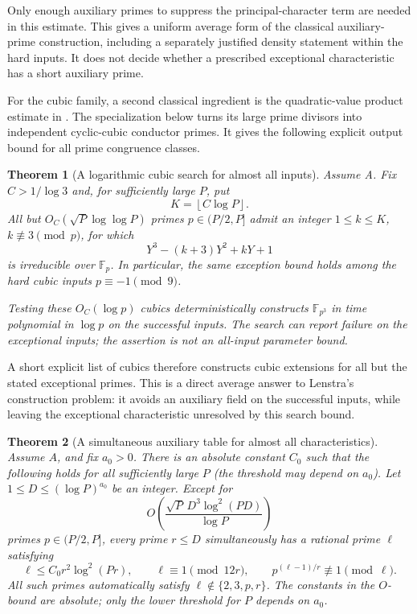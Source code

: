\documentclass[11pt]{article}
\newtheorem{theorem}{Theorem}[section]
\theoremstyle{definition}
\theoremstyle{remark}
\begin{document}
Only enough auxiliary primes to suppress the principal-character term
are needed in this estimate. This gives a uniform average form of the
classical auxiliary-prime construction, including a separately justified
density statement within the hard inputs. It does not decide whether a
prescribed exceptional characteristic has a short auxiliary prime.

For the cubic family, a second classical ingredient is the quadratic-value product estimate in \citet[Lemmas~1, 3, and 4 and \S2.4, pp.~1131--1134]{Cilleruelo2011}. The specialization below turns its large prime divisors into independent cyclic-cubic conductor primes. It gives the following explicit output bound for all prime congruence classes.

\begin{theorem}[A logarithmic cubic search for almost all inputs]
\label{thm:almost-all-small-tate}
Assume A.  Fix $C>1/\log3$ and, for sufficiently large $P$, put
\[
 K=\left\lfloor C\log P\right\rfloor.
\]
All but $O_C(\sqrt P\log\log P)$ primes $p\in(P/2,P]$
admit an integer $1\le k\le K$, $k\not\equiv3\pmod p$,
for which
\[
 Y^3-(k+3)Y^2+kY+1
\]
is irreducible over $\mathbb F_p$.  In particular, the same
exception bound holds among the hard cubic inputs
$p\equiv-1\pmod9$.

Testing these $O_C(\log p)$ cubics deterministically constructs
$\mathbb F_{p^3}$ in time polynomial in $\log p$ on the
successful inputs.  The search can report failure on the
exceptional inputs; the assertion is not an all-input parameter
bound.
\end{theorem}

A short explicit list of cubics therefore constructs cubic extensions
for all but the stated exceptional primes. This is a direct average
answer to Lenstra's construction problem: it avoids an auxiliary field
on the successful inputs, while leaving the exceptional characteristic
unresolved by this search bound.


\begin{theorem}[A simultaneous auxiliary table for almost all characteristics]\label{thm:aa-12r}
Assume \(A\), and fix \(a_0>0\). There is an absolute constant \(C_0\)
such that the following holds for all sufficiently large \(P\)
(the threshold may depend on \(a_0\)).
Let \(1\leq D\leq(\log P)^{a_0}\) be an integer.
Except for
\begin{equation}\label{eq:aa-12r-exceptions}
 O\!\left(
       \frac{\sqrt P\,D^3\log^2(PD)}{\log P}
    \right)
\end{equation}
primes \(p\in(P/2,P]\), every prime \(r\leq D\) simultaneously has
a rational prime \(\ell\) satisfying
\begin{equation}\label{eq:aa-12r-aux}
 \ell\leq C_0r^2\log^2(Pr),\qquad
 \ell\equiv1\pmod{12r},\qquad
 p^{(\ell-1)/r}\not\equiv1\pmod\ell.
\end{equation}
All such primes automatically satisfy
\(\ell\notin\{2,3,p,r\}\).
The constants in the \(O\)-bound are absolute; only the lower
threshold for \(P\) depends on \(a_0\).
\end{theorem}
\end{document}
